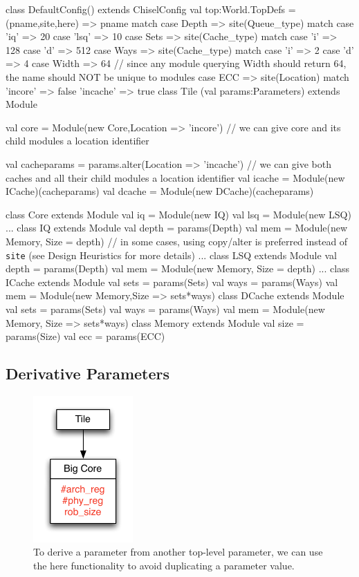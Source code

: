 \documentclass[10pt,twocolumn]{article}
\def\code#1{{\small\tt #1}}
\begin{document}
\begin{scala}
class DefaultConfig() extends ChiselConfig {
  val top:World.TopDefs = {
    (pname,site,here) => pname match {
      case Depth => site(Queue_type) match {
        case 'iq' => 20
        case 'lsq' => 10
      }
      case Sets => site(Cache_type) match {
        case 'i' => 128
        case 'd' => 512
      }
      case Ways => site(Cache_type) match {
        case 'i' => 2
        case 'd' => 4
      }
      case Width => 64
      // since any module querying Width should return 64, the name should NOT be unique to modules
      case ECC => site(Location) match {
        'incore' => false
        'incache' => true
      }
    }
  }
}
class Tile (val params:Parameters) extends Module { 
  val core = Module(new Core,{Location => 'incore'})
  // we can give core and its child modules a location identifier
  
  val cacheparams = params.alter({Location => 'incache'})
  // we can give both caches and all their child modules a location identifier
  val icache = Module(new ICache)(cacheparams)
  val dcache = Module(new DCache)(cacheparams)
}
class Core extends Module {
  val iq = Module(new IQ)
  val lsq = Module(new LSQ)
  ...
}
class IQ extends Module {
  val depth = params(Depth)
  val mem = Module(new Memory, {Size = depth})
  // in some cases, using copy/alter is preferred instead of \code{site} (see Design Heuristics for more details)
  ...
}
class LSQ extends Module {
  val depth = params(Depth)
  val mem = Module(new Memory, {Size = depth})
  ...
}
class ICache extends Module {
  val sets = params(Sets)
  val ways = params(Ways)
  val mem = Module(new Memory,{Size => sets*ways})
}
class DCache extends Module {
  val sets = params(Sets)
  val ways = params(Ways)
  val mem = Module(new Memory, {Size => sets*ways})
}
class Memory extends Module {
  val size = params(Size)
  val ecc = params(ECC)
}
\end{scala}

\subsection{Derivative Parameters}

\begin{figure}[h]
\centering
\includegraphics[width=1.5in]{figs/ex5.pdf}
\caption{To derive a parameter from another top-level parameter, we can use the here functionality to avoid duplicating a parameter value.}
\label{fig:ex5}
\end{figure}
\end{document}
